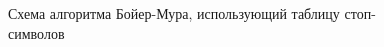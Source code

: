 \documentclass[a4paper,12pt]{article}
\begin{document}
\begin{figure}[H]
\caption{Схема алгоритма Бойер-Мура, использующий таблицу стоп-символов}
\label{images:boyermurjump}
\end{figure}
\end{document}
